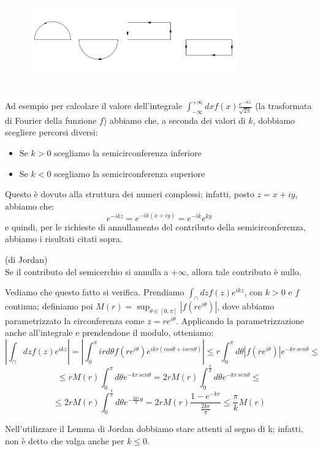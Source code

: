 \begin{figure}[h!]
  \centering
    \includegraphics[width=0.8\textwidth]{immagini/percorsi_possibili.png}
\end{figure}
\\
Ad esempio per calcolare il valore dell'integrale $\int_{-\infty} ^{+\infty} dx f(x) \frac{e^{-ikz}}{\sqrt{2 \pi}}$ (la trasformata di Fourier della funzione $f$) abbiamo che, a seconda dei valori di $k$, dobbiamo scegliere percorsi diversi:
\begin{itemize}
\item Se $k>0$ scegliamo la semicirconferenza inferiore
\item Se $k<0$ scegliamo la semicirconferenza superiore
\end{itemize}
Questo è dovuto alla struttura dei numeri complessi; infatti, posto $z=x+iy$, abbiamo che:
$$e^{-ikz}=e^{-ik(x+iy)}=e^{-ik} e^{ky}$$
e quindi, per le richieste di annullamento del contributo della semicirconferenza, abbiamo i risultati citati sopra.
\begin{lemma} (di Jordan)\\
Se il contributo del semicerchio si annulla a $+\infty$, allora tale contributo è nullo.
\end{lemma}
Vediamo che questo fatto si verifica. Prendiamo $\int_{\cap} dz f(z) e^{ikz}$, con $k>0$ e $f$ continua; definiamo poi $M(r)=\sup_{\theta \in [0,\pi]} |f(r e^{i \theta})|$, dove abbiamo parametrizzato la circonferenza come $z=r e^{i \theta}$. Applicando la parametrizzazione anche all'integrale e prendendone il modulo, otteniamo:
$$\left|\int_{\cap} dz f(z) e^{ikz}\right|=\left|\int_0 ^{\pi} ird\theta f(r e^{i \theta}) e^{ikr(cos \theta + i sen \theta)}\right| \leq r \int_0 ^{\pi} d \theta |f(r e^{i \theta})| e^{-kr \, sen\theta} \leq$$
$$\leq r M(r) \int_0 ^{\pi} d \theta e^{-kr \, sen\theta} = 2 r M(r) \int_0 ^{\frac{\pi}{2}} d \theta e^{-kr \, sen\theta} \leq$$
$$\leq 2 r M(r) \int_0 ^{\frac{\pi}{2}} d \theta e^{-\frac{2kr}{\pi} \theta}=2rM(r) \frac{1-e^{-kr}}{\frac{2kr}{\pi}} \leq \frac{\pi}{k} M(r)$$
\begin{osservazione}
Nell'utilizzare il Lemma di Jordan dobbiamo stare attenti al segno di k; infatti, non è detto che valga anche per $k \leq 0$.
\end{osservazione}





